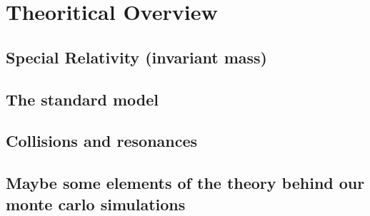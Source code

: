 
\section{Theoritical Overview}
\label{sec:org0f4e988}
\subsection{Special Relativity (invariant mass)}
\label{sec:org14bef5b}
\subsection{The standard model}
\label{sec:org26fd473}
\subsection{Collisions and resonances}
\label{sec:orgaf0b776}
\subsection{Maybe some elements of the theory behind our monte carlo simulations}
\label{sec:org109ec89}
